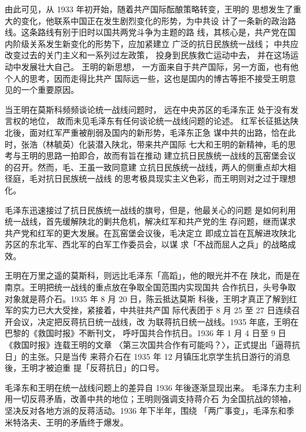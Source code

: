由此可见，从 1933 年初开始，随着共产国际酝酿策略转变，王明的
思想发生了重大的变化，他联系中国正在发生剧烈变化的形势，为中共设
计了一条新的政治路线。这条路线有别于旧时以国共两党斗争为主题的路
线，其核心是，共产党在国内阶级关系发生新变化的形势下，应加紧建立
广泛的抗日民族统一战线；
中共应改变过去的关门主义和一系列过左政策，
投身到民族救亡运动中去，
并在这场运动中发展壮大自己。
王明的新思想，
一方面来自于共产国际，另一方面，也有他个人的思考，因而走得比共产
国际远一些，这也是国内的博古等拒不接受王明意见的一个重要原因。

当王明在莫斯科频频谈论统一战线问题时，
远在中央苏区的毛泽东正
处于没有发言权的地位，
故而未见毛泽东有任何谈论统一战线问题的论述。
红军长征抵达陕北後，面对红军严重被削弱及国内的新形势，毛泽东正急
谋中共的出路，恰在此时，张浩（林毓英）化装潜入陕北，带来共产国际
七大和王明的新精神，毛的思考与王明的思路一拍即合，故而有旨在推动
建立抗日民族统一战线的瓦窑堡会议的召开。然而，毛、王虽一致同意建
立抗日民族统一战线，两人的侧重点却大相径庭，毛对抗日民族统一战线
的思考极具现实主义色彩，而王明则对之过于理想化。

毛泽东迅速接过了抗日民族统一战线的旗号，但是，他最关心的问题
是如何利用统一战线，首先缓解陕北的剿共危机，解决红军和共产党的生
存问题，继而谋求共产党和红军的更大发展。在瓦窑堡会议後，毛决定立
即成立旨在瓦解进攻陕北苏区的东北军、西北军的白军工作委员会，以谋
求「不战而屈人之兵」的战略成效。

王明在万里之遥的莫斯科，则远比毛泽东「高蹈」，他的眼光并不在
陕北，而是在南京。王明把统一战线的重点放在争取全国范围内实现国共
合作抗日，头号争取对象就是蒋介石。1935 年 8 月 20 日，陈云抵达莫斯
科後，王明才真正了解到红军的实力已大大受挫，紧接着，中共驻共产国
际代表团于 8 月 25 至 27 日连续召开会议，决定把反蒋抗日统一战线，改
为联蒋抗日统一战线。1935 年底，王明在巴黎的《救国时报》不断刊文，
呼吁国共合作抗日。1936 年 1 月 4 日至 9 日《救国时报》连载王明的文章
〈第三次国共合作有可能吗？〉，正式提出「逼蒋抗日」的主张。只是当传
来蒋介石在 1935 年 12 月镇压北京学生抗日游行的消息後，王明才被迫重
提「反蒋抗日」的口号。

毛泽东和王明在统一战线问题上的差异自 1936 年後逐渐显现出来。
毛泽东力主利用一切反蒋矛盾，改善中共的地位；王明则强调支持蒋介石
为全国抗战的领袖，坚决反对各地方派的反蒋活动。1936 年下半年，围绕
「两广事变」，毛泽东和季米特洛夫、王明的矛盾终于爆发。

